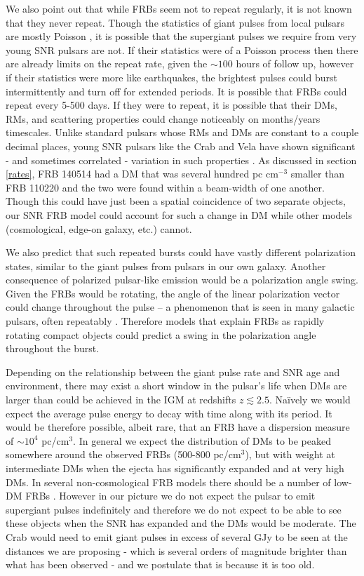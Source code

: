 \documentclass[useAMS,usenatbib]{mn2e}
\begin{document}
We also point out that while FRBs seem not to repeat regularly, 
it is not known that they never repeat. Though the statistics 
of giant pulses from local pulsars are mostly Poisson \citep{1999ApJ...517..460S},
it is possible that 
the supergiant pulses we require from very young SNR pulsars are not. If their 
statistics were of a Poisson process then there are already limits on the repeat rate, 
given the $\sim100$ hours of follow up, however if their statistics were more like
earthquakes, the brightest pulses could burst intermittently and turn off
for extended periods. It is possible that FRBs could repeat every 5-500 days. 
If they were to repeat,
it is possible that their DMs, RMs, and scattering properties could 
change noticeably on months/years timescales. Unlike standard pulsars 
whose RMs and DMs are constant to a couple decimal places, young 
SNR pulsars like the Crab and Vela have shown significant - and sometimes
correlated - variation in such properties \citep{1988A&A...202..166R, 2008A&A...483...13K}.
As discussed in section \ref{rates}, FRB 140514 had a DM that was several hundred
pc cm$^{-3}$ smaller than FRB 110220 and the two were found within a beam-width 
of one another. Though this could have just been a spatial coincidence of two
separate objects, our SNR FRB model 
could account for such a change in DM while other models (cosmological, edge-on 
galaxy, etc.) cannot. 

We also predict that such repeated 
bursts could have vastly different polarization states, similar to the giant 
pulses from pulsars in our own galaxy. Another consequence of polarized 
pulsar-like emission would be a polarization angle swing. Given the FRBs
would be rotating, the angle of the linear polarization vector could 
change throughout the pulse -- a phenomenon that is seen in many 
galactic pulsars, often repeatably \citep{2006ApJ...645.1421B}. Therefore models 
that explain FRBs as rapidly rotating compact objects could predict a swing in the 
polarization angle throughout the burst.

Depending on the relationship between the giant pulse rate and SNR
age and environment, there may exist a short window in the pulsar's life when 
DMs are larger than could be achieved in the IGM at redshifts $z\lesssim2.5$. 
Na\"ively we would expect the average pulse 
energy to decay with time along with its period. 
It would be therefore possible, albeit rare, that an FRB have a dispersion 
measure of $\sim10^4$ pc/cm$^3$. In general we expect the distribution of DMs 
to be peaked somewhere around the observed FRBs (500-800  pc/cm$^3$),
but with weight at intermediate 
DMs when the ejecta has significantly expanded and at very high DMs. In several
non-cosmological FRB models there should be a number of low-DM FRBs
 \citep{2015arXiv150101341P, 2015arXiv150400200X}. However in our 
picture we do not expect the pulsar to emit supergiant pulses indefinitely and 
therefore we do not expect to be able to see these objects when the SNR has 
expanded and the DMs would be moderate.
The Crab would need to emit giant pulses in excess of several GJy to be 
seen at the distances we are proposing - which is several orders of
magnitude brighter than what has been observed - 
and we postulate that is because it is too old.
 
\end{document}
